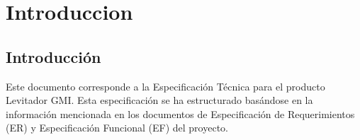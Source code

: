 \chapter{Introduccion}  \label{cap:Introducción}

\section{Introducción}

Este documento corresponde a la Especificación Técnica para el producto Levitador GMI.
Esta especificación se ha estructurado basándose en la información mencionada en los
documentos de Especificación de Requerimientos (ER) y Especificación Funcional (EF) del
proyecto.






